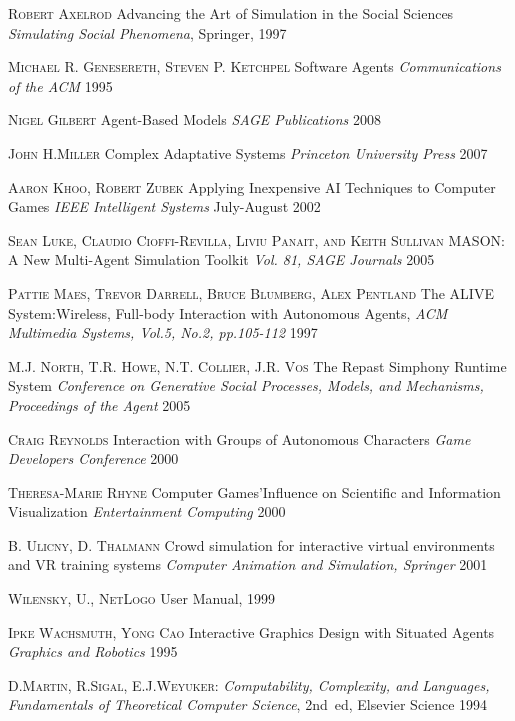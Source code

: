 \documentclass[runningheads]{llncs}
\begin{document}
\begin{thebibliography}{0}

\textsc{Robert Axelrod}
\newblock Advancing the Art of Simulation in the Social Sciences
\newblock \emph{Simulating Social Phenomena}, Springer, 1997

\textsc{Michael R. Genesereth, Steven P. Ketchpel}
\newblock Software Agents
\newblock \emph{Communications of the ACM} 1995

\textsc{Nigel Gilbert}
\newblock Agent-Based Models
\newblock \emph{SAGE Publications} 2008

\textsc{John H.Miller}
\newblock Complex Adaptative Systems
\newblock \emph{Princeton University Press} 2007

\textsc{Aaron Khoo, Robert Zubek}
\newblock Applying Inexpensive AI Techniques to Computer Games
\newblock \emph{IEEE Intelligent Systems} July-August 2002

\textsc{Sean Luke, Claudio Cioffi-Revilla, Liviu Panait, and Keith Sullivan}
\newblock MASON: A New Multi-Agent Simulation Toolkit
\newblock \emph{Vol. 81, SAGE Journals} 2005

\textsc{Pattie Maes, Trevor Darrell, Bruce Blumberg, Alex Pentland}
\newblock The ALIVE System:Wireless, Full-body Interaction with Autonomous Agents,
\newblock \emph{ACM Multimedia Systems, Vol.5, No.2, pp.105-112} 1997

\textsc{M.J. North, T.R. Howe, N.T. Collier, J.R. Vos}
\newblock The Repast Simphony Runtime System
\newblock \emph{Conference on Generative Social Processes, Models, and Mechanisms, Proceedings of the Agent} 2005

\textsc{Craig Reynolds}
\newblock Interaction with Groups of Autonomous Characters
\newblock \emph{Game Developers Conference} 2000

\textsc{Theresa-Marie Rhyne}
\newblock Computer Games’Influence on Scientific and Information Visualization
\newblock \emph{Entertainment Computing} 2000

\textsc{B. Ulicny, D. Thalmann}
\newblock Crowd simulation for interactive virtual environments and VR training systems
\newblock \emph{Computer Animation and Simulation, Springer} 2001

\textsc{Wilensky, U., NetLogo}
\newblock User Manual, 1999

\textsc{Ipke Wachsmuth, Yong Cao}
\newblock Interactive Graphics Design with Situated Agents
\newblock \emph{Graphics and Robotics} 1995

\textsc{D.Martin, R.Sigal, E.J.Weyuker}:
\emph{Computability, Complexity, and Languages, Fundamentals of Theoretical Computer Science},
2nd~ed, Elsevier Science 1994

\end{thebibliography}
\end{document}
